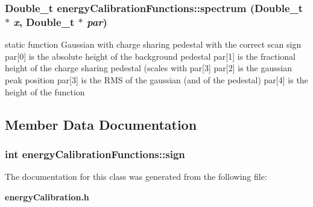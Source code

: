 \subsubsection{\setlength{\rightskip}{0pt plus 5cm}Double\_\-t energy\-Calibration\-Functions::spectrum (Double\_\-t $\ast$ {\em x}, Double\_\-t $\ast$ {\em par})}\label{classenergyCalibrationFunctions_015eb05dc34b77642ab2a2a9f126f170}


static function Gaussian with charge sharing pedestal with the correct scan sign par[0] is the absolute height of the background pedestal par[1] is the fractional height of the charge sharing pedestal (scales with par[3] par[2] is the gaussian peak position par[3] is the RMS of the gaussian (and of the pedestal) par[4] is the height of the function 

\subsection{Member Data Documentation}
\subsubsection{\setlength{\rightskip}{0pt plus 5cm}int \bf{energy\-Calibration\-Functions::sign}\hspace{0.3cm}{\tt  [private]}}\label{classenergyCalibrationFunctions_4fc7c435169b5bf4672cf654270097d0}




The documentation for this class was generated from the following file:\begin{CompactItemize}
\item 
\bf{energy\-Calibration.h}\end{CompactItemize}

